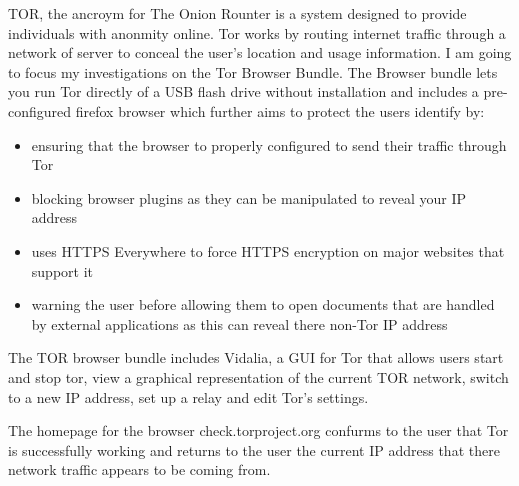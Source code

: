 \documentclass[12pt,a4paper,oneside]{article}
\begin{document}
TOR, the ancroym for The Onion Rounter is a system designed to provide individuals with anonmity online. Tor works by routing internet traffic through a network of server to conceal the user's location and usage information. 
I am going to focus my investigations on the Tor Browser Bundle. The Browser bundle lets you run Tor directly of a USB flash drive without installation and includes a pre-configured firefox browser which further aims to protect the users identify by:
\begin{itemize}
\item ensuring that the browser to properly configured to send their traffic through Tor
\item blocking browser plugins as they can be manipulated to reveal your IP address 
\item uses HTTPS Everywhere to force HTTPS encryption on major websites that support it
\item warning the user before allowing them to open documents that are handled by external applications as this can reveal there non-Tor IP address

\end{itemize}

The TOR browser bundle includes Vidalia, a GUI for Tor that allows users start and stop tor, view a graphical representation of the current TOR network, switch to a new IP address, set up a relay and edit Tor's settings.

The homepage for the browser check.torproject.org confurms to the user that Tor is successfully working and returns to the user the current IP address that there network traffic appears to be coming from.
\end{document}
